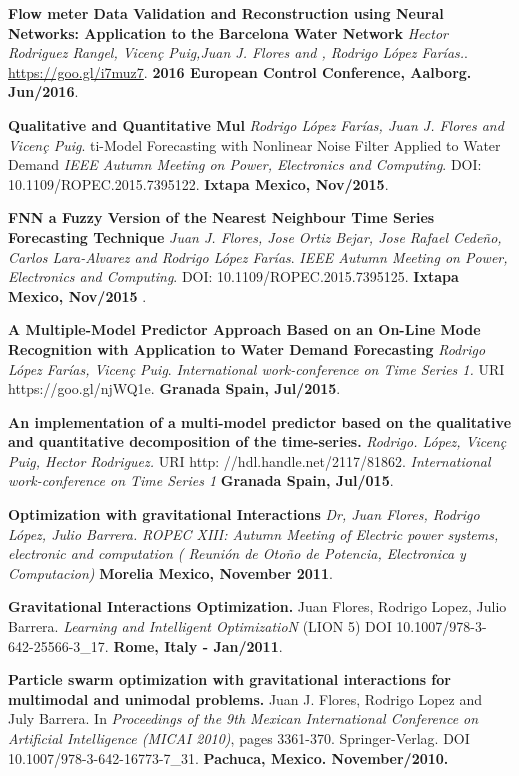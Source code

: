 \documentclass[10pt]{article}
\newenvironment{innerlist}[1][\enskip\textbullet]%
        {\begin{compactitem}[#1]}{\end{compactitem}}
\begin{document}
\begin{innerlist}
\item \textbf{Flow meter Data Validation and Reconstruction using Neural Networks: Application to the Barcelona Water Network} \textit{Hector Rodriguez Rangel, Vicen\c{c} Puig,Juan J. Flores and ,  Rodrigo López Farías.}. \url{https://goo.gl/i7muz7}. \textbf{2016 European Control Conference, Aalborg. Jun/2016}.

\item \textbf{Qualitative and Quantitative Mul} \textit{Rodrigo López Farías, Juan J. Flores and Vicen\c{c} Puig}.  ti-Model Forecasting with Nonlinear Noise Filter Applied to Water Demand \textit{IEEE Autumn Meeting on Power, Electronics and Computing}. DOI: 10.1109/ROPEC.2015.7395122.  \textbf{Ixtapa Mexico, Nov/2015}.

\item \textbf{FNN a Fuzzy Version of the Nearest Neighbour Time Series Forecasting Technique } \textit{Juan J. Flores, Jose Ortiz Bejar, Jose Rafael Cedeño, Carlos Lara-Alvarez and Rodrigo López Farías}. \textit{IEEE Autumn Meeting on Power, Electronics and Computing}. DOI: 10.1109/ROPEC.2015.7395125. \textbf{Ixtapa Mexico, Nov/2015 }.

\item \textbf{A Multiple-Model Predictor Approach Based on an On-Line Mode Recognition with Application to Water Demand Forecasting} \textit{Rodrigo López Farías, Vicen\c{c} Puig}.  \textit{International work-conference on Time Series 1. 
} URI https://goo.gl/njWQ1e. \textbf{Granada Spain, Jul/2015}.

\item \textbf{An implementation of a multi-model predictor based on the qualitative and quantitative decomposition of the time-series.} \textit{Rodrigo. López, Vicen\c{c} Puig, Hector Rodriguez.} URI http: //hdl.handle.net/2117/81862. \textit{International work-conference on Time Series 1 
} \textbf{Granada Spain, Jul/015}.

\item \textbf{Optimization with gravitational Interactions} \textit{Dr, Juan Flores, Rodrigo López, Julio Barrera.}   \textit{ROPEC XIII: Autumn Meeting of Electric power systems, electronic and computation ( Reunión de Oto\~no de Potencia, Electronica y Computacion)} \textbf{ Morelia Mexico, November 2011}.

\item \textbf{Gravitational Interactions Optimization.} Juan Flores, Rodrigo Lopez, Julio Barrera.  \textit{Learning and Intelligent OptimizatioN}  (LION 5) DOI 10.1007/978-3-642-25566-3\_17. \textbf{Rome, Italy - Jan/2011}. 

\item \textbf{Particle swarm optimization with gravitational interactions for multimodal and unimodal problems.} Juan J. Flores, Rodrigo Lopez and July Barrera.  In \textit{Proceedings of the 9th Mexican International Conference on Artificial Intelligence (MICAI 2010)}, pages 3361-370. Springer-Verlag. DOI 10.1007/978-3-642-16773-7\_31. \textbf{Pachuca, Mexico. November/2010.}

\end{innerlist}
\end{document}
